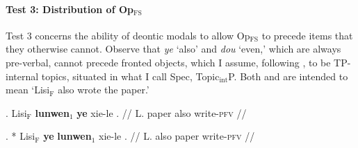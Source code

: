 \documentclass[11pt]{article}
\let\latextextsubscript\textsubscript
\let\textsubscript\latextextsubscript
\newcommand{\gap}[1]{\rule{1em}{0.4pt}\textsubscript{#1}}
\newcommand{\F}{\ensuremath{_{\mathrm{F}}}}
\newcommand{\opfs}{Op\(_{\mathrm{FS}}\)}
\newcommand{\topobj}{Topic\(_{\mathrm{int}}\)P}
\begin{document}
%
%



\paragraph{Test 3: Distribution of \opfs{}}



Test 3 concerns the ability of deontic modals to allow \opfs{} to precede items that they otherwise cannot.
Observe that \emph{ye} `also' and \emph{dou} `even,'  which are always pre-verbal, cannot precede fronted objects, which I assume, following \citet{chenObscuredUniversalityMandarin2023}, to be TP-internal topics, situated in what I call Spec, \topobj.
Both \Next and \NNext are intended to mean `Lisi\F{} also wrote the paper.'
%
\begin{paracol}{2}
 \ex. \begingl
\gla Lisi\F{} \textbf{lunwen}\(_1\) \textbf{ye} xie-le \nogloss{\gap{1}}. //
  \glb L. paper also write-\textsc{pfv} //
\endgl
 
  \switchcolumn
 \ex. * \begingl
\gla Lisi\F{} \textbf{ye} \textbf{lunwen}\(_1\) xie-le \nogloss{\gap{1}}. //
  \glb L. also paper write-\textsc{pfv} //
\endgl

\end{paracol}
\end{document}
